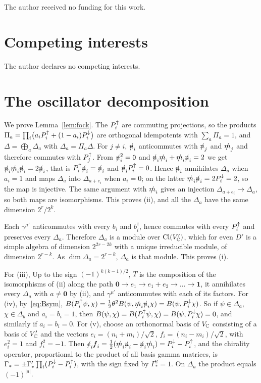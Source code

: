 The author received no funding for this work.

\section*{Competing interests}

The author declares no competing interests.

\appendix
{}
\renewcommand{\thefigure}{\Alph{section}.\arabic{figure}}
\renewcommand{\thetable}{\Alph{section}.\arabic{table}}
\renewcommand{\theequation}{\Alph{section}.\arabic{equation}}

\section{The oscillator decomposition}
\label{app:fock}

We prove Lemma~\ref{lem:fock}. The $P^{\uparrow}_i$ are commuting projections, so the products $\Pi_a=\prod_i\bigl(a_iP^{\uparrow}_i+(1-a_i)P^{\downarrow}_i\bigr)$ are orthogonal idempotents with $\sum_a\Pi_a=1$, and $\Delta=\bigoplus_a\Delta_a$ with $\Delta_a=\Pi_a\Delta$. For $j\ne i$, $\slashed{n}_i$ anticommutes with $\slashed{n}_j$ and $\slashed{m}_j$ and therefore commutes with $P^{\uparrow}_j$. From $\slashed{n}_i^2=0$ and $\slashed{n}_i\slashed{m}_i+\slashed{m}_i\slashed{n}_i=2$ we get $\slashed{n}_i\slashed{m}_i\slashed{n}_i=2\slashed{n}_i$, that is $P^{\uparrow}_i\slashed{n}_i=\slashed{n}_i$ and $\slashed{n}_iP^{\uparrow}_i=0$. Hence $\slashed{n}_i$ annihilates $\Delta_a$ when $a_i=1$ and maps $\Delta_a$ into $\Delta_{a+e_i}$ when $a_i=0$; on the latter $\slashed{m}_i\slashed{n}_i=2P^{\downarrow}_i=2$, so the map is injective. The same argument with $\slashed{m}_i$ gives an injection $\Delta_{a+e_i}\to\Delta_a$, so both maps are isomorphisms. This proves (ii), and all the $\Delta_a$ have the same dimension $2^r/2^k$.

Each $\gamma^{\mu'}$ anticommutes with every $b_i$ and $b_i^\dagger$, hence commutes with every $P^{\uparrow}_i$ and preserves every $\Delta_a$. Therefore $\Delta_a$ is a module over $\operatorname{Cl}(V'_{\mathbb{C}})$, which for even $D'$ is a simple algebra of dimension $2^{2r-2k}$ with a unique irreducible module, of dimension $2^{r-k}$. As $\dim\Delta_a=2^{r-k}$, $\Delta_a$ is that module. This proves (i).

For (iii), Up to the sign $(-1)^{k(k-1)/2}$, $T$ is the composition of the isomorphisms of (ii) along the path $\mathbf 0\to e_1\to e_1+e_2\to\dots\to\mathbf 1$, it annihilates every $\Delta_a$ with $a\ne\mathbf 0$ by (ii), and $\gamma^{\mu'}$ anticommutes with each of its factors. For (iv), by~\eqref{eq:Bsym}, $B(P^{\uparrow}_i\psi,\chi)=\frac12\theta^2B(\psi,\slashed{m}_i\slashed{n}_i\chi)=B(\psi,P^{\downarrow}_i\chi)$. So if $\psi\in\Delta_a$, $\chi\in\Delta_b$ and $a_i=b_i=1$, then $B(\psi,\chi)=B(P^{\uparrow}_i\psi,\chi)=B(\psi,P^{\downarrow}_i\chi)=0$, and similarly if $a_i=b_i=0$. For (v), choose an orthonormal basis of $V_{\mathbb{C}}$ consisting of a basis of $V'_{\mathbb{C}}$ and the vectors $e_i=(n_i+m_i)/\sqrt2$, $f_i=(n_i-m_i)/\sqrt2$, with $e_i^2=1$ and $f_i^2=-1$. Then $\slashed e_i\slashed f_i=\frac12(\slashed{m}_i\slashed{n}_i-\slashed{n}_i\slashed{m}_i)=P^{\downarrow}_i-P^{\uparrow}_i$, and the chirality operator, proportional to the product of all basis gamma matrices, is $\Gamma_*=\pm\Gamma'_*\prod_i(P^{\downarrow}_i-P^{\uparrow}_i)$, with the sign fixed by $\Gamma_*^2=1$. On $\Delta_a$ the product equals $(-1)^{|a|}$.

